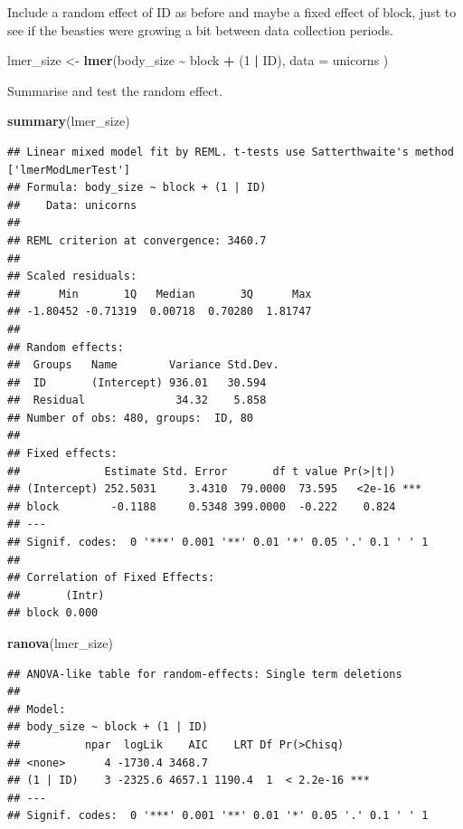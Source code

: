 \documentclass[
  12pt,
]{book}
\newenvironment{Shaded}{\begin{snugshade}}{\end{snugshade}}
\newcommand{\DataTypeTok}[1]{\textcolor[rgb]{0.13,0.29,0.53}{#1}}
\newcommand{\DecValTok}[1]{\textcolor[rgb]{0.00,0.00,0.81}{#1}}
\newcommand{\KeywordTok}[1]{\textcolor[rgb]{0.13,0.29,0.53}{\textbf{#1}}}
\newcommand{\NormalTok}[1]{#1}
\newcommand{\OperatorTok}[1]{\textcolor[rgb]{0.81,0.36,0.00}{\textbf{#1}}}
\newcommand{\StringTok}[1]{\textcolor[rgb]{0.31,0.60,0.02}{#1}}
\begin{document}
Include a random effect of ID as before and maybe a fixed effect of block, just to see if the beasties were growing a bit between data collection periods.

\begin{Shaded}
\begin{Highlighting}[]
\NormalTok{lmer\_size \textless{}{-}}\StringTok{ }\KeywordTok{lmer}\NormalTok{(body\_size }\OperatorTok{\textasciitilde{}}\StringTok{ }\NormalTok{block }\OperatorTok{+}\StringTok{ }\NormalTok{(}\DecValTok{1} \OperatorTok{|}\StringTok{ }\NormalTok{ID),}
  \DataTypeTok{data =}\NormalTok{ unicorns}
\NormalTok{)}
\end{Highlighting}
\end{Shaded}

Summarise and test the random effect.

\begin{Shaded}
\begin{Highlighting}[]
\KeywordTok{summary}\NormalTok{(lmer\_size)}
\end{Highlighting}
\end{Shaded}

\begin{verbatim}
## Linear mixed model fit by REML. t-tests use Satterthwaite's method ['lmerModLmerTest']
## Formula: body_size ~ block + (1 | ID)
##    Data: unicorns
## 
## REML criterion at convergence: 3460.7
## 
## Scaled residuals: 
##      Min       1Q   Median       3Q      Max 
## -1.80452 -0.71319  0.00718  0.70280  1.81747 
## 
## Random effects:
##  Groups   Name        Variance Std.Dev.
##  ID       (Intercept) 936.01   30.594  
##  Residual              34.32    5.858  
## Number of obs: 480, groups:  ID, 80
## 
## Fixed effects:
##             Estimate Std. Error       df t value Pr(>|t|)    
## (Intercept) 252.5031     3.4310  79.0000  73.595   <2e-16 ***
## block        -0.1188     0.5348 399.0000  -0.222    0.824    
## ---
## Signif. codes:  0 '***' 0.001 '**' 0.01 '*' 0.05 '.' 0.1 ' ' 1
## 
## Correlation of Fixed Effects:
##       (Intr)
## block 0.000
\end{verbatim}

\begin{Shaded}
\begin{Highlighting}[]
\KeywordTok{ranova}\NormalTok{(lmer\_size)}
\end{Highlighting}
\end{Shaded}

\begin{verbatim}
## ANOVA-like table for random-effects: Single term deletions
## 
## Model:
## body_size ~ block + (1 | ID)
##          npar  logLik    AIC    LRT Df Pr(>Chisq)    
## <none>      4 -1730.4 3468.7                         
## (1 | ID)    3 -2325.6 4657.1 1190.4  1  < 2.2e-16 ***
## ---
## Signif. codes:  0 '***' 0.001 '**' 0.01 '*' 0.05 '.' 0.1 ' ' 1
\end{verbatim}
\end{document}
